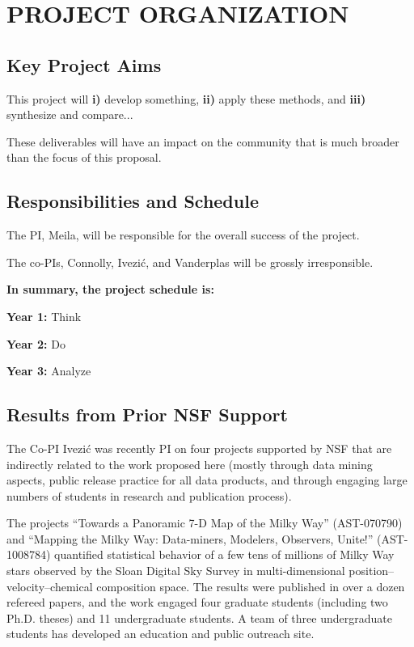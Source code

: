 
\section{    {\bf        PROJECT ORGANIZATION         }}
\label{plan}

\subsection{                      Key Project Aims                   }
 
This project will  {\bf i)}  develop something, {\bf ii)} 
apply these methods, and {\bf iii)}  synthesize and compare...

These deliverables will have an impact on the community that is much broader 
than the focus of this proposal. 


\subsection{Responsibilities and Schedule}

The PI, Meila, will be responsible for the overall success of the project.


The co-PIs, Connolly, Ivezi\'{c}, and Vanderplas will be grossly irresponsible. 


{\bf In summary, the project schedule is:}

{\bf Year 1:}
Think

{\bf Year 2:}
Do

{\bf Year 3:}
Analyze


\subsection{             Results from Prior NSF Support             }
\label{sec:priorNSF}

The Co-PI Ivezi\'{c} was recently PI on four projects supported by NSF that
are indirectly related to the work proposed here (mostly through data mining
aspects, public release practice for all data products, and through engaging large 
numbers of students in research and publication process). 

The projects ``Towards a Panoramic 7-D Map of the Milky Way'' (AST-070790) and 
``Mapping the Milky Way: Data-miners, Modelers, Observers, Unite!'' (AST-1008784)
quantified statistical behavior of a few tens of millions of Milky Way stars observed by 
the Sloan Digital Sky Survey in multi-dimensional position--velocity--chemical composition 
space. The results were published in over a dozen refereed papers, and the work engaged
four graduate students (including two Ph.D. theses) and 11 undergraduate students.
A team of three undergraduate students has developed an education and public outreach site.


